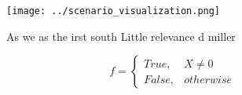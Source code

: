 \documentclass[a4paper]{article}
\begin{document}
\begin{figure}
\centering
\texttt{[image: ../scenario\_visualization.png]}
\caption{As we as the irst south Little relevance d miller
}
\end{figure}
 
\begin{equation}   f =
\begin{cases} True, & X \neq 0\\
False, & otherwise
\end{cases}
\end{equation}
\end{document}
